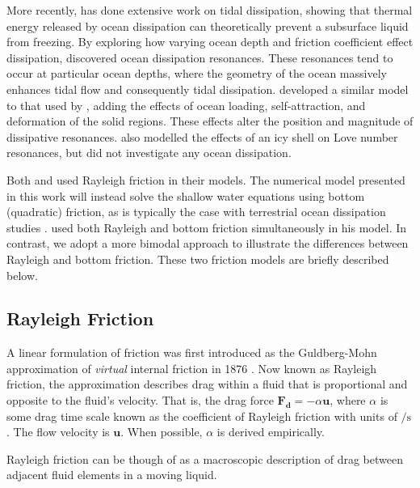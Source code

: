 More recently, \citet{tyler2008strong,tyler2009ocean,tyler2011tidal,tyler2014comparative} has done extensive work on tidal dissipation, showing that thermal energy released by ocean dissipation can theoretically prevent a subsurface liquid from freezing. By exploring how varying ocean depth and friction coefficient effect dissipation, \citet{tyler2011tidal} discovered ocean dissipation resonances. These resonances tend to occur at particular ocean depths, where the geometry of the ocean massively enhances tidal flow and consequently tidal dissipation. \citet{matsuyama2014tidal} developed a similar model to that used by \citet{tyler2011tidal}, adding the effects of ocean loading, self-attraction, and deformation of the solid regions. These effects alter the position and magnitude of dissipative resonances. \citet{kamata2015tidal} also modelled the effects of an icy shell on Love number resonances, but did not investigate any ocean dissipation.

Both \citet{tyler2011tidal} and \citet{matsuyama2014tidal} used Rayleigh friction in their models. The numerical model presented in this work will instead solve the shallow water equations using bottom (quadratic) friction, as is typically the case with terrestrial ocean dissipation studies \citep{taylor1920tidal,jeffreys1921tidal,zahel1977global,egbert2001estimates,jayne2001parameterizing}. \citet{sears1995tidal} used both Rayleigh and bottom friction simultaneously in his model. In contrast, we adopt a more bimodal approach to illustrate the differences between Rayleigh and bottom friction. These two friction models are briefly described below.

\subsection{Rayleigh Friction}

A linear formulation of friction was first introduced as the Guldberg-Mohn approximation of \textit{virtual} internal friction in 1876 \citep{neumann1968ocean}. Now known as Rayleigh friction, the approximation describes drag within a fluid that is proportional and opposite to the fluid's velocity. That is, the drag force $\bm{F_d} = -\alpha \bm{u}$, where $\alpha$ is some drag time scale known as the coefficient of Rayleigh friction with units of $\si{\per\second}$. The flow velocity is $\bm{u}$. When possible, $\alpha$ is derived empirically.

Rayleigh friction can be though of as a macroscopic description of drag between adjacent fluid elements in a moving liquid.


